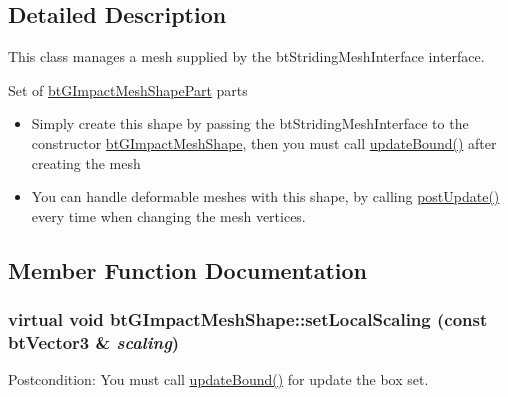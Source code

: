 \subsection{Detailed Description}
This class manages a mesh supplied by the btStridingMeshInterface interface. 

Set of \hyperlink{classbt_g_impact_mesh_shape_part}{btGImpactMeshShapePart} parts\begin{itemize}
\item Simply create this shape by passing the btStridingMeshInterface to the constructor \hyperlink{classbt_g_impact_mesh_shape}{btGImpactMeshShape}, then you must call \hyperlink{classbt_g_impact_shape_interface_cb26c2d7a2aecabd06b996b72b848492}{updateBound()} after creating the mesh\end{itemize}


\begin{itemize}
\item You can handle deformable meshes with this shape, by calling \hyperlink{classbt_g_impact_mesh_shape_fbf7ae3408bc0ab975c46ed65820a4b2}{postUpdate()} every time when changing the mesh vertices. \end{itemize}


\subsection{Member Function Documentation}
\hypertarget{classbt_g_impact_mesh_shape_ed8d5e4b2e75538109909d44b244bc35}{
\subsubsection[setLocalScaling]{\setlength{\rightskip}{0pt plus 5cm}virtual void btGImpactMeshShape::setLocalScaling (const btVector3 \& {\em scaling})}}
\label{classbt_g_impact_mesh_shape_ed8d5e4b2e75538109909d44b244bc35}


\begin{Desc}
\item[Postcondition:]You must call \hyperlink{classbt_g_impact_shape_interface_cb26c2d7a2aecabd06b996b72b848492}{updateBound()} for update the box set. \end{Desc}


